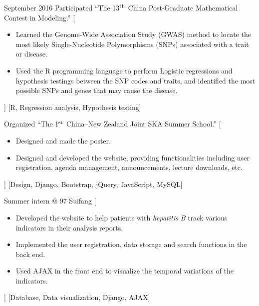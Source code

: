 \documentclass{resume}
\begin{document}
\begin{experiences}



  \separator{0.5em}
  \experience
    {September 2016}%
    {Participated
      \enquote{The 13$^{\rm th}$ China Post-Graduate Mathematical
        Contest in Modeling.}}%
    [\begin{itemize}
      \item Learned the Genome-Wide Association Study (GWAS) method
        to locate the most likely Single-Nucleotide Polymorphisms (SNPs)
        associated with a trait or disease.
      \item Used the R programming language to perform Logistic regressions
        and hypothesis testings between the SNP codes and traits, and
        identified the most possible SNPs and genes that may cause the
        disease.
    \end{itemize}]%
    [R, Regression analysis, Hypothesis testing]

  \separator{0.5em}
    {Organized
      \enquote{The 1$^{\rm st}$ China--New Zealand Joint SKA Summer School.}}%
    [\begin{itemize}
      \item Designed and made the poster.
      \item Designed and developed the website,
        providing functionalities including user registration,
        agenda management, announcements, lecture downloads, etc.
    \end{itemize}]%
    [Design, Django, Bootstrap, jQuery, JavaScript, MySQL]

  \separator{0.5em}
    {Summer intern @ 97 Suifang}%
    [\begin{itemize}
      \item Developed the website to help patients with \textit{hepatitis B}
        track various indicators in their analysis reports.
      \item Implemented the user registration, data storage and search
        functions in the back end.
      \item Used AJAX in the front end to visualize the temporal variations
        of the indicators.
    \end{itemize}]%
    [Database, Data visualization, Django, AJAX]


\end{experiences}
\end{document}
